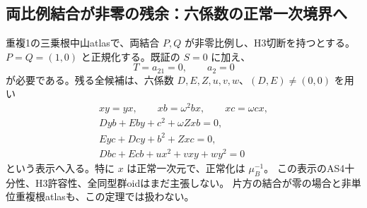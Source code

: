 \subsection{両比例結合が非零の残余：六係数の正常一次境界へ}
\label{subsec:cubic-third-root-unit-proportional-Szero-cover}
\begin{theorem}[両非零比例結合の必要被覆]
\label{thm:cubic-third-root-unit-proportional-Szero-cover}
重複1の三乗根中山atlasで、両結合 $P,Q$ が非零比例し、H3切断を持つとする。
$P=Q=(1,0)$ と正規化する。既証の $S=0$ に加え、
\[
 T=a_{21}=0,\qquad a_2=0
\]
が必要である。残る全候補は、六係数 $D,E,Z,u,v,w$、$(D,E)\ne(0,0)$ を用い
\begin{gather*}
 xy=yx,\qquad xb=\omega^2bx,\qquad xc=\omega cx,\\
 Dyb+Eby+c^2+\omega Zxb=0,\\
 Eyc+Dcy+b^2+Zxc=0,\\
 Dbc+Ecb+u x^2+vxy+w y^2=0
\end{gather*}
という表示へ入る。特に $x$ は正常一次元で、正常化は $\mu_B^{-1}$。
この表示のAS4十分性、H3許容性、全同型群oidはまだ主張しない。
片方の結合が零の場合と非単位重複根atlasも、この定理では扱わない。
\end{theorem}
